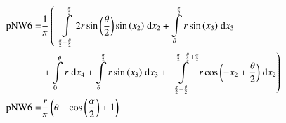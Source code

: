 \begin{align}
    \mathrm{pNW6} =&\frac{1}{\pi} \left(\;\;\int\limits_{\frac{\pi}{2} - \frac{\theta}{2}}^{\frac{\pi}{2}}2 r \sin{\left (\frac{\theta}{2} \right )} \sin{\left (x_{2} \right )}\;\mathrm{d}x_{2}+\int\limits_{\theta}^{\frac{\pi}{2}}r \sin{\left (x_{3} \right )}\;\mathrm{d}x_{3}\right.\notag\\
 &\left.+\int\limits_{0}^{\theta}r\;\mathrm{d}x_{4}+\int\limits_{\theta}^{\frac{\pi}{2}}r \sin{\left (x_{3} \right )}\;\mathrm{d}x_{3}+\int\limits_{\frac{\pi}{2} - \frac{\theta}{2}}^{- \frac{\pi}{2} + \frac{\theta}{2} + \frac{\alpha}{2}}r \cos{\left (- x_{2} + \frac{\theta}{2} \right )}\;\mathrm{d}x_{2}\right)\label{pNW6Def}\\
    \mathrm{pNW6} =& \frac{r}{\pi} \left(\theta - \cos{\left (\frac{\alpha}{2} \right )} + 1\right)\label{pNW6Sln}
\end{align}